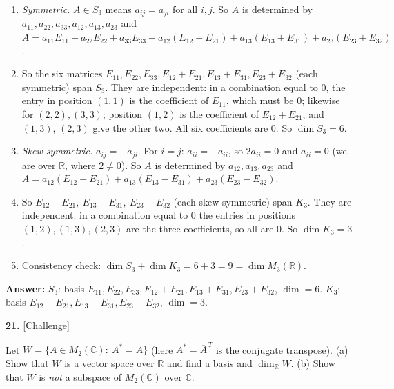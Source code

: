 \documentclass[11pt]{article}
\begin{document}
\begin{tcolorbox}[breakable,colback=ans,colframe=ansb,boxrule=0.5pt,left=4pt,right=4pt,top=2pt,bottom=2pt]\begin{enumerate}[leftmargin=3.1em,itemsep=1pt,topsep=1pt,label=\textbf{Step \arabic*.}]\item \emph{Symmetric.} $A\in S_3$ means $a_{ij}=a_{ji}$ for all $i,j$. So $A$ is determined by $a_{11},a_{22},a_{33},a_{12},a_{13},a_{23}$ and $A=a_{11}E_{11}+a_{22}E_{22}+a_{33}E_{33}+a_{12}(E_{12}+E_{21})+a_{13}(E_{13}+E_{31})+a_{23}(E_{23}+E_{32})$.
\item So the six matrices $E_{11},E_{22},E_{33},E_{12}+E_{21},E_{13}+E_{31},E_{23}+E_{32}$ (each symmetric) span $S_3$. They are independent: in a combination equal to $0$, the entry in position $(1,1)$ is the coefficient of $E_{11}$, which must be $0$; likewise for $(2,2),(3,3)$; position $(1,2)$ is the coefficient of $E_{12}+E_{21}$, and $(1,3)$, $(2,3)$ give the other two. All six coefficients are $0$. So $\dim S_3=6$.
\item \emph{Skew-symmetric.} $a_{ij}=-a_{ji}$. For $i=j$: $a_{ii}=-a_{ii}$, so $2a_{ii}=0$ and $a_{ii}=0$ (we are over $\mathbb{R}$, where $2\neq0$). So $A$ is determined by $a_{12},a_{13},a_{23}$ and $A=a_{12}(E_{12}-E_{21})+a_{13}(E_{13}-E_{31})+a_{23}(E_{23}-E_{32})$.
\item So $E_{12}-E_{21},\ E_{13}-E_{31},\ E_{23}-E_{32}$ (each skew-symmetric) span $K_3$. They are independent: in a combination equal to $0$ the entries in positions $(1,2),(1,3),(2,3)$ are the three coefficients, so all are $0$. So $\dim K_3=3$.
\item Consistency check: $\dim S_3+\dim K_3=6+3=9=\dim M_3(\mathbb{R})$.
\end{enumerate}\textbf{Answer:} $S_3$: basis $E_{11},E_{22},E_{33},E_{12}+E_{21},E_{13}+E_{31},E_{23}+E_{32}$, $\dim=6$. $K_3$: basis $E_{12}-E_{21},E_{13}-E_{31},E_{23}-E_{32}$, $\dim=3$.\end{tcolorbox}
\par\vspace{2pt}
\begin{minipage}{\linewidth}\textbf{21.} \hfill{\scriptsize\color{ink}[Challenge]}\par\nopagebreak Let $W=\{A\in M_2(\mathbb{C}):\ A^{*}=A\}$ (here $A^{*}=\overline{A}^{\,T}$ is the conjugate transpose). (a) Show that $W$ is a vector space over $\mathbb{R}$ and find a basis and $\dim_{\mathbb{R}}W$. (b) Show that $W$ is \emph{not} a subspace of $M_2(\mathbb{C})$ over $\mathbb{C}$.
\end{minipage}\par\nopagebreak
\end{document}
